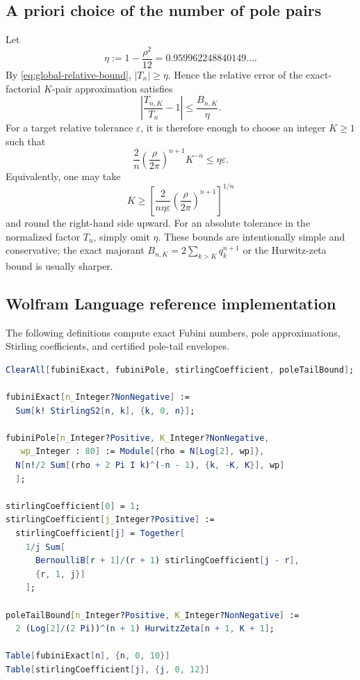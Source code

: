 \documentclass[11pt,a4paper,oneside]{article}
\theoremstyle{definition}
\theoremstyle{remark}
\begin{document}
\subsection{A priori choice of the number of pole pairs}
Let
\[
 \eta:=1-\frac{\rho^2}{12}=0.959962248840149\ldots.
\]
By \cref{eq:global-relative-bound}, $|T_n|\ge\eta$.  Hence the relative error
of the exact-factorial $K$-pair approximation satisfies
\[
 \left|\frac{T_{n,K}}{T_n}-1\right|\le\frac{B_{n,K}}{\eta}.
\]
For a target relative tolerance $\varepsilon$, it is therefore enough to
choose an integer $K\ge1$ such that
\begin{equation}\label{eq:choose-K}
 \frac{2}{n}\left(\frac{\rho}{2\pi}\right)^{n+1}K^{-n}
 \le\eta\varepsilon.
\end{equation}
Equivalently, one may take
\begin{equation}\label{eq:choose-K-solved}
 K\ge
 \left[
 \frac{2}{n\eta\varepsilon}
 \left(\frac{\rho}{2\pi}\right)^{n+1}
 \right]^{1/n}
\end{equation}
and round the right-hand side upward.  For an absolute tolerance in the
normalized factor $T_n$, simply omit $\eta$.  These bounds are intentionally
simple and conservative; the exact majorant
$B_{n,K}=2\sum_{k>K}q_k^{n+1}$ or the Hurwitz-zeta bound is usually sharper.

\subsection{Wolfram Language reference implementation}
The following definitions compute exact Fubini numbers, pole approximations,
Stirling coefficients, and certified pole-tail envelopes.

\begin{lstlisting}[language=Mathematica,caption={Reference implementation in Wolfram Language.}]
ClearAll[fubiniExact, fubiniPole, stirlingCoefficient, poleTailBound];

fubiniExact[n_Integer?NonNegative] :=
  Sum[k! StirlingS2[n, k], {k, 0, n}];

fubiniPole[n_Integer?Positive, K_Integer?NonNegative,
   wp_Integer : 80] := Module[{rho = N[Log[2], wp]},
  N[n!/2 Sum[(rho + 2 Pi I k)^(-n - 1), {k, -K, K}], wp]
  ];

stirlingCoefficient[0] = 1;
stirlingCoefficient[j_Integer?Positive] :=
  stirlingCoefficient[j] = Together[
    1/j Sum[
      BernoulliB[r + 1]/(r + 1) stirlingCoefficient[j - r],
      {r, 1, j}]
    ];

poleTailBound[n_Integer?Positive, K_Integer?NonNegative] :=
  2 (Log[2]/(2 Pi))^(n + 1) HurwitzZeta[n + 1, K + 1];

Table[fubiniExact[n], {n, 0, 10}]
Table[stirlingCoefficient[j], {j, 0, 12}]
\end{lstlisting}
\end{document}
